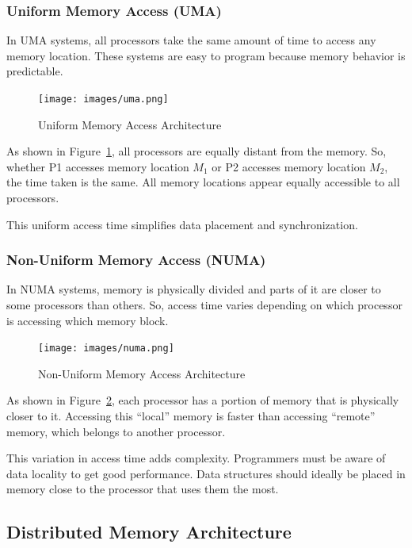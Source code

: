 \documentclass[12pt]{book}
\begin{document}
\subsubsection{Uniform Memory Access (UMA)}

In UMA systems, all processors take the same amount of time to access any memory location. These systems are easy to program because memory behavior is predictable.

\begin{figure}[H]
    \centering
    \texttt{[image: images/uma.png]}
    \caption{Uniform Memory Access Architecture}
    \label{fig:uma}
\end{figure}

As shown in Figure~\ref{fig:uma}, all processors are equally distant from the memory. So, whether P1 accesses memory location $M_1$ or P2 accesses memory location $M_2$, the time taken is the same. All memory locations appear equally accessible to all processors.

This uniform access time simplifies data placement and synchronization.

\subsubsection{Non-Uniform Memory Access (NUMA)}

In NUMA systems, memory is physically divided and parts of it are closer to some processors than others. So, access time varies depending on which processor is accessing which memory block.

\begin{figure}[H]
    \centering
    \texttt{[image: images/numa.png]}
    \caption{Non-Uniform Memory Access Architecture}
    \label{fig:numa}
\end{figure}

As shown in Figure~\ref{fig:numa}, each processor has a portion of memory that is physically closer to it. Accessing this “local” memory is faster than accessing “remote” memory, which belongs to another processor.

This variation in access time adds complexity. Programmers must be aware of data locality to get good performance. Data structures should ideally be placed in memory close to the processor that uses them the most.

\subsection{Distributed Memory Architecture}
\end{document}
